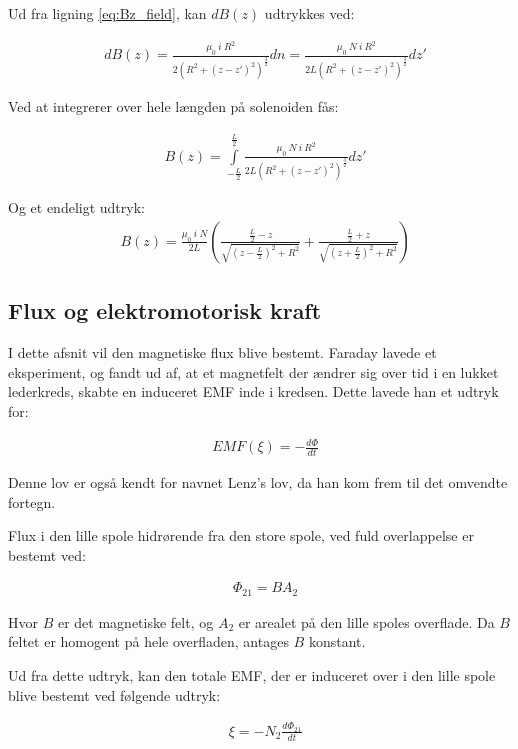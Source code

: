 Ud fra ligning \ref{eq:Bz_field}, kan $dB(z)$ udtrykkes ved: 

\begin{align}
	&dB(z)=\frac{\mu_0 \: i \: R^2}{2(R^2+(z-z')^2)^\frac{3}{2}}dn=\frac{\mu_0 \: N \: i \: R^2}{2L(R^2+(z-z')^2)^\frac{3}{2}}dz'
\end{align}

Ved at integrerer over hele længden på solenoiden fås:

\begin{align}
	&B(z)=\int\limits_{-\frac{L}{2}}^{\frac{L}{2}}\frac{\mu_0 \: N \: i \: R^2}{2L(R^2+(z-z')^2)^\frac{3}{2}}dz'
\end{align}

Og et endeligt udtryk:
\begin{align}
	&B(z)= \frac{\mu_0 \: i \: N}{2L}\left(\frac{\frac{L}{2}-z}{\sqrt{(z-\frac{L}{2})^2+R^2}}+\frac{\frac{L}{2}+z}{\sqrt{(z+\frac{L}{2})^2+R^2}}\right) \label{eq:B_field2}
\end{align}

\subsection{Flux og elektromotorisk kraft}
I dette afsnit vil den magnetiske flux blive bestemt.  
Faraday lavede et eksperiment, og fandt ud af, at et magnetfelt der ændrer sig over tid i en lukket lederkreds, skabte en induceret EMF inde i kredsen.
Dette lavede han et udtryk for:

\begin{align}
	&EMF(\xi) = - \frac{d\Phi}{dt}
\end{align}

Denne lov er også kendt for navnet Lenz's lov, da han kom frem til det omvendte fortegn.

Flux i den lille spole hidrørende fra den store spole, ved fuld overlappelse er bestemt ved:

\begin{align}
	&\Phi_{21} = BA_2
\end{align}

Hvor $B$ er det magnetiske felt, og $A_2$ er arealet på den lille spoles overflade.
Da $B$ feltet er homogent på hele overfladen, antages $B$ konstant. 

Ud fra dette udtryk, kan den totale EMF, der er induceret over i den lille spole blive bestemt ved følgende udtryk:

\begin{align}
	&\xi = -N_2\frac{d\Phi_{21}}{dt} \label{eq:emf_lille_spole}
\end{align}

